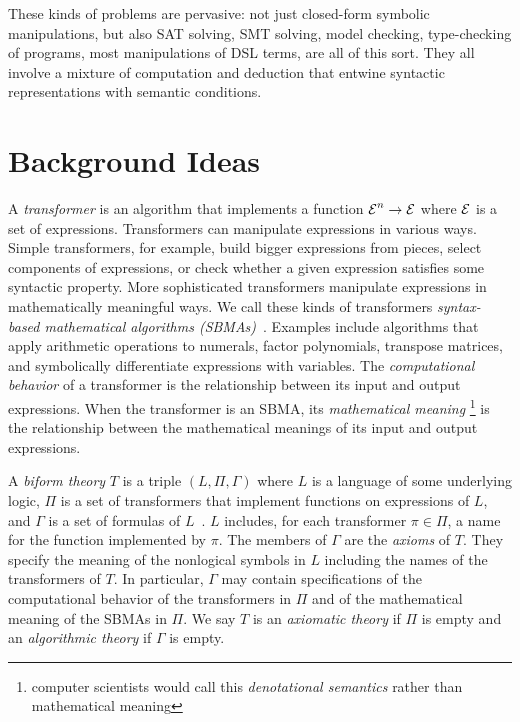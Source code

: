 \documentclass[fleqn]{llncs}
\begin{document}
These kinds of problems are pervasive: not just closed-form symbolic
manipulations, but also SAT solving, SMT solving, model checking,
type-checking of programs, most manipulations of DSL terms, are all
of this sort.  They all involve a mixture of computation and deduction
that entwine syntactic representations with semantic conditions.

\section{Background Ideas}

A \emph{transformer} is an algorithm that implements a function $\mbox{$\cal E$}^n
\rightarrow \mbox{$\cal E$}$ where $\mbox{$\cal E$}$ is a set of expressions.  Transformers can
manipulate expressions in various ways.  Simple transformers, for
example, build bigger expressions from pieces, select components of
expressions, or check whether a given expression satisfies some
syntactic property.  More sophisticated transformers manipulate
expressions in mathematically meaningful ways.  We call these kinds of
transformers \emph{syntax-based mathematical algorithms
  (SBMAs)}~\cite{Farmer13}.  Examples include algorithms that apply
arithmetic operations to numerals, factor polynomials, transpose
matrices, and symbolically differentiate expressions with variables.
The \emph{computational behavior} of a transformer is the relationship
between its input and output expressions.  When the transformer is an
SBMA, its \emph{mathematical meaning}%
\footnote{computer scientists would call this \emph{denotational semantics}
rather than mathematical meaning} is the relationship between the
mathematical meanings of its input and output expressions.

A \emph{biform theory} $T$ is a triple $(L,\Pi,\Gamma)$ where $L$ is a
language of some underlying logic, $\Pi$ is a set of transformers that
implement functions on expressions of $L$, and $\Gamma$ is a set of
formulas of
$L$~\cite{CaretteFarmer08,Farmer07b,FarmerMohrenschildt03}.  $L$
includes, for each transformer $\pi \in \Pi$, a name for the function
implemented by $\pi$.  The members of $\Gamma$ are the \emph{axioms}
of $T$.  They specify the meaning of the nonlogical symbols in $L$
including the names of the transformers of $T$.  In particular,
$\Gamma$ may contain specifications of the computational behavior of
the transformers in $\Pi$ and of the mathematical meaning of the SBMAs
in $\Pi$.  We say $T$ is an \emph{axiomatic theory} if $\Pi$ is empty
and an \emph{algorithmic theory} if $\Gamma$ is empty.
\end{document}
